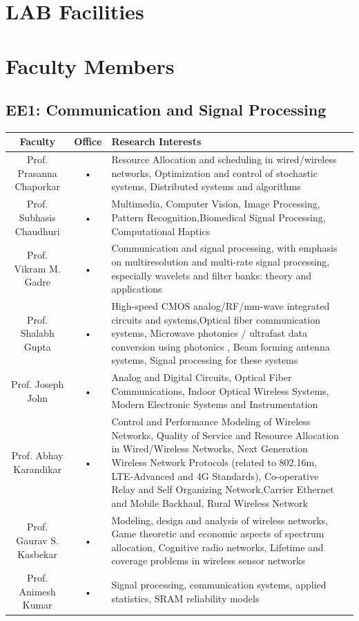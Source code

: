 \documentclass[11pt,fleqn,openany]{book} %
\begin{document}
\chapter{LAB Facilities}

\chapter{Faculty Members}
\section{EE1: Communication and Signal Processing}
\begin{tabular}{|c|c|p{6cm}|c}
\hline 
Faculty  & Office  & Research Interests \\ 
\hline
Prof. Prasanna Chaporkar & • & Resource Allocation and scheduling in wired/wireless networks, Optimization and control of stochastic systems, Distributed systems and algorithms \\ 
\hline 
Prof. Subhasis Chaudhuri & • & Multimedia, Computer Vision, Image Processing, Pattern Recognition,Biomedical Signal Processing, Computational Haptics \\ 
\hline 
Prof. Vikram M. Gadre & • & Communication and signal processing, with emphasis on multiresolution
and multi-rate signal processing, especially wavelets and filter banks:
theory and applications \\ 
\hline 
Prof. Shalabh Gupta & • & High-speed CMOS analog/RF/mm-wave integrated circuits and systems,Optical fiber communication systems, Microwave photonics / ultrafast data  conversion using photonics , Beam forming antenna systems, Signal processing for these systems \\ 
\hline 
Prof. Joseph John & • & Analog and Digital Circuits, Optical Fiber Communications, Indoor Optical Wireless Systems, Modern Electronic Systems and Instrumentation \\ 
\hline 
Prof. Abhay Karandikar & • & Control and Performance Modeling of Wireless Networks, Quality of Service and Resource Allocation in Wired/Wireless Networks, Next Generation Wireless Network Protocols (related to 802.16m, LTE-Advanced and 4G Standards), Co-operative Relay and Self Organizing Network,Carrier Ethernet and Mobile Backhaul, Rural Wireless Network \\ 
\hline 
Prof. Gaurav S. Kasbekar& • & Modeling, design and analysis of wireless networks, Game theoretic and economic aspects of spectrum allocation, Cognitive radio networks,
Lifetime and coverage problems in wireless sensor networks \\ 
\hline 
Prof. Animesh Kumar  & • & Signal processing, communication systems, applied statistics, SRAM reliability models \\ 
\hline 
\end{tabular} 
\end{document}
